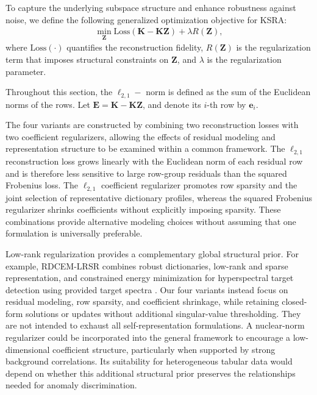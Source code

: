 \documentclass[ASNA,twocolumn]{USG} %
\begin{document}
To capture the underlying subspace structure and enhance robustness against noise, we define the following generalized optimization objective for KSRA:
\begin{eqnarray}\label{Generalized_case}
	\min_{\boldsymbol{Z}}\text{Loss}(\boldsymbol{K}-\boldsymbol{K}\boldsymbol{Z})+\lambda R(\boldsymbol{Z}),
\end{eqnarray}
where $\text{Loss}(\cdot)$ quantifies the reconstruction fidelity, $R(\boldsymbol{Z})$ is the regularization term that imposes structural constraints on $\boldsymbol{Z}$, and $\lambda$ is the regularization parameter.

Throughout this section, the $\ell_{2,1}-$ norm is defined as the sum of the Euclidean norms of the rows. Let $\boldsymbol{E}=\boldsymbol{K}-\boldsymbol{KZ}$, and denote its $i$-th row by $\boldsymbol{e}_i$.

The four variants are constructed by combining two reconstruction losses with two coefficient regularizers, allowing the effects of residual modeling and representation structure to be examined within a common framework. The $\ell_{2,1}$ reconstruction loss grows linearly with the Euclidean norm of each residual row and is therefore less sensitive to large row-group residuals than the squared Frobenius loss. The $\ell_{2,1}$ coefficient regularizer promotes row sparsity and the joint selection of representative dictionary profiles, whereas the squared Frobenius regularizer shrinks coefficients without explicitly imposing sparsity. These combinations provide alternative modeling choices without assuming that one formulation is universally preferable.

Low-rank regularization provides a complementary global structural prior. For example, RDCEM-LRSR combines robust dictionaries, low-rank and sparse representation, and constrained energy minimization for hyperspectral target detection using provided target spectra \cite{lin2026hyperspectral}. Our four variants instead focus on residual modeling, row sparsity, and coefficient shrinkage, while retaining closed-form solutions or updates without additional singular-value thresholding. They are not intended to exhaust all self-representation formulations. A nuclear-norm regularizer could be incorporated into the general framework to encourage a low-dimensional coefficient structure, particularly when supported by strong background correlations. Its suitability for heterogeneous tabular data would depend on whether this additional structural prior preserves the relationships needed for anomaly discrimination.
\end{document}
